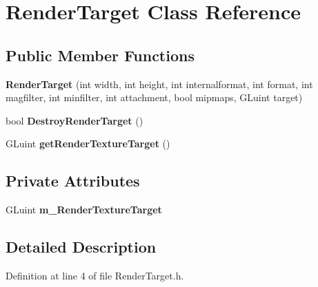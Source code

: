 \hypertarget{class_render_target}{}\section{Render\+Target Class Reference}
\label{class_render_target}
\subsection*{Public Member Functions}
\begin{DoxyCompactItemize}
\item 
{\bfseries Render\+Target} (int width, int height, int internalformat, int format, int magfilter, int minfilter, int attachment, bool mipmaps, G\+Luint target)\hypertarget{class_render_target_a9ae081732db41da6ec5737994ec2b1fc}{}\label{class_render_target_a9ae081732db41da6ec5737994ec2b1fc}

\item 
bool {\bfseries Destroy\+Render\+Target} ()\hypertarget{class_render_target_ac27458508694096a6a56e87419019e21}{}\label{class_render_target_ac27458508694096a6a56e87419019e21}

\item 
G\+Luint {\bfseries get\+Render\+Texture\+Target} ()\hypertarget{class_render_target_a0af6f53457cf6115ae5cad5bb5d1770e}{}\label{class_render_target_a0af6f53457cf6115ae5cad5bb5d1770e}

\end{DoxyCompactItemize}
\subsection*{Private Attributes}
\begin{DoxyCompactItemize}
\item 
G\+Luint {\bfseries m\+\_\+\+Render\+Texture\+Target}\hypertarget{class_render_target_acfe59b77fa0efe88bfc1fde43a623cde}{}\label{class_render_target_acfe59b77fa0efe88bfc1fde43a623cde}

\end{DoxyCompactItemize}


\subsection{Detailed Description}


Definition at line 4 of file Render\+Target.\+h.

